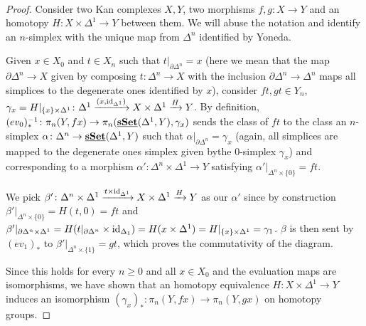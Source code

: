 \documentclass[a4paper,11pt,openany]{scrartcl}
\begin{document}
~\\
\begin{proof}
    Consider two Kan complexes $X,Y$, two morphisms $f,g\colon X\rightarrow Y$
    and an homotopy $H\colon X\times\Delta^1\rightarrow Y$ between them. We
    will abuse the notation and
    identify an $n$-simplex with the unique map from $\Delta^n$ identified by
    Yoneda.

    Given $x\in X_0$ and $t\in X_n$ such that $t|_{\partial\Delta^n}=x$ (here we
    mean that the map $\partial\Delta^n\rightarrow X$ given by composing
    $t\colon\Delta^n\rightarrow X$ with the inclusion
    $\partial\Delta^n\rightarrow\Delta^n$ maps all simplices to the degenerate
    ones identified by $x$), consider $ft,gt\in Y_n$,
    $\gamma_x=H|_{\{x\}\times\Delta^1}\colon\Delta^1\xrightarrow{(x,\operatorname{id}_{\Delta^1})}X\times\Delta^1\xrightarrow{H} Y$.
    By definition,
    $(ev_0)^{-1}_*\colon\pi_n(Y,fx)\rightarrow\pi_n(\operatorname{\underline{\mathbf{sSet}}}(\Delta^1,Y),\gamma_x)$
    sends the class of $ft$ to the class an $n$-simplex
    $\alpha\colon\Delta^n\rightarrow\operatorname{\underline{\mathbf{sSet}}}(\Delta^1,Y)$ such that
    $\alpha|_{\partial\Delta^n}=\gamma_x$ (again, all simplices are mapped to
    the degenerate ones simplex given bythe $0$-simplex $\gamma_x$) and
    corresponding to a morphism $\alpha'\colon\Delta^n\times\Delta^1\rightarrow
    Y$ satisfying $\alpha'|_{\Delta^n\times\{0\}}=ft$.

    We pick $\beta'\colon \Delta^n\times\Delta^1\xrightarrow{t\times\operatorname{id}_{\Delta^1}}X\times\Delta^1\xrightarrow{H}Y$
    as our $\alpha'$ since by construction
    $\beta'|_{\Delta^n\times\{0\}}=H(t,0)=ft$ and
    $\beta'|_{\partial\Delta^n\times\Delta^1}=H(t|_{\partial\Delta^n}\times\operatorname{id}_{\Delta_1})=H(x\times\Delta^1)=H|_{\{x\}\times\Delta^1}=\gamma_1$.
    $\beta$ is then sent by $(ev_1)_*$ to $\beta'|_{\Delta^n\times\{1\}}=gt$,
    which proves the commutativity of the diagram.

    Since this holds for every $n\geq 0$ and all $x\in X_0$ and the evaluation
    maps are isomorphisms, we have shown that
    an homotopy equivalence $H\colon X\times\Delta^1\rightarrow Y$ induces an
    isomorphism $(\gamma_x)_*\colon\pi_n(Y,fx)\rightarrow\pi_n(Y,gx)$ on
    homotopy groups.
\end{proof}
\end{document}
